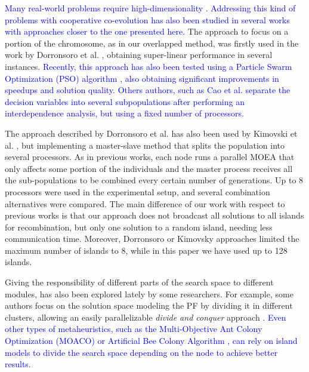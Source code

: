 \documentclass[preprint]{elsarticle}
\begin{document}
\textcolor{blue}{Many real-world problems require high-dimensionality \cite{Zhang17DECAL,XU2018268}.
Addressing this kind of problems with cooperative co-evolution has
also been studied in several works with approaches closer to the one
presented here.} The approach to focus on a portion of the chromosome,
as in our overlapped method, was firstly used in the work by
Dorronsoro et al. \citep{Dorronsoro13superlinear}, obtaining
super-linear performance 
in several instances. \textcolor{blue}{Recently, this approach has also been tested using a Particle Swarm Optimization (PSO) algorithm \cite{DorronsoroPSO2018}, also obtaining significant improvements in speedups and solution quality. Others authors, such as Cao et al. \cite{CaoZLL17} separate the decision variables into several subpopulations after performing an interdependence analysis, but using a fixed number of processors.}

The approach described by Dorronsoro et al. has also been used by Kimovski et al. \citep{Kimovski15Parallel}, but implementing a
master-slave method that splits the population into several processors. As in previous works, each node
runs a parallel MOEA that only affects some portion of 
the individuals and the master
process receives all the sub-populations to be combined every certain number of generations. Up to 8 processors
were used in the experimental setup, and several
combination alternatives were compared. The main difference of our work with respect to previous works is that our approach does not 
broadcast all solutions to all islands for recombination, but only one solution to a random island, needing less
communication time. Moreover, Dorronsoro or Kimovsky approaches limited the maximum number of islands to 8, while in this paper we have
used up to 128 islands. 

Giving the responsibility of different parts of the search space to
different modules, has also been explored lately by some
researchers. For example, some authors focus on the solution space
modeling the PF by dividing it in different clusters, allowing an
easily parallelizable {\em divide and conquer} approach
\citep{cheng2015adaptive}. 
\textcolor{blue}{Even other types of metaheuristics, 
such as the Multi-Objective Ant Colony Optimization (MOACO) \cite{Mora13paretobased}
or Artificial Bee Colony Algorithm \cite{LUO2017235}, 
can rely on island models to divide the search space depending on 
the node to achieve better results. }
\end{document}
